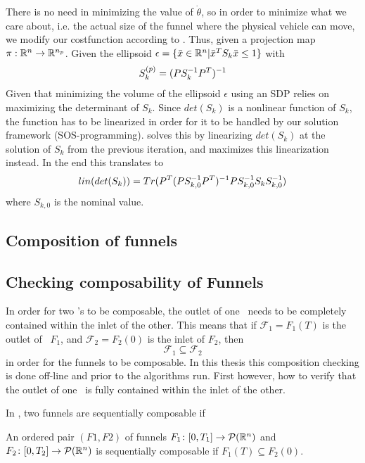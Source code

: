 There is no need in minimizing the value of \(\dot{\theta}\), so in order to
minimize what we care about, i.e. the actual size of the funnel where the
physical vehicle can move, we modify our costfunction according to
\cite{majumdarFunnelLibrariesRealtime2017}. Thus, given a projection map \(\pi :
\mathbb{R}^n \rightarrow \mathbb{R}^{n_p}\). Given the ellipsoid \(\epsilon = \lbrace\bar{x} \in
  \mathbb{R}^n | \bar{x}^TS_{k}\bar{x} \leq 1\rbrace\) with
\[
  S_k^{(p)} = \lparen PS_k^{-1}P^T\rparen^{-1}
\]
Given that minimizing the volume of the ellipsoid \(\epsilon\) using an SDP
relies on maximizing the determinant of \(S_k\). Since \(det(S_k)\) is a
nonlinear function of \(S_k\), the function has to be linearized in order for it
to be handled by our solution framework (SOS-programming).
\cite{majumdarFunnelLibrariesRealtime2017} solves this by linearizing
\(det(S_k)\) at the solution of \(S_k\) from the previous iteration, and
maximizes this linearization instead. In the end this translates to
\[
  lin\lparen det\lparen S_k\rparen\rparen =
  Tr\lparen P^T\lparen PS_{k,0}^{-1}P^T\rparen^{-1}PS_{k,0}^{-1}S_kS_{k,0}^{-1}\rparen
\]
where \(S_{k,0}\) is the nominal value.

\subsection{Composition of funnels}

\subsection{Checking composability of Funnels}

In order for two \funnel's to be composable, the outlet of one \funnel\ needs to
be completely contained within the inlet of the other. This means that if
\(\mathcal{F}_1 = F_1(T)\) is the outlet of \funnel\ \(F_1\), and
\(\mathcal{F}_2 = F_2(0)\) is the inlet of \(F_2\), then
\[
  \mathcal{F}_1 \subseteq \mathcal{F}_2
\]
\label{composability}
in order for the funnels to be composable. In this thesis this composition
checking is done off-line and prior to the algorithms run. First however, how to
verify that the outlet of one \funnel\ is fully contained within the inlet of
the other.

In \cite[Majumdar and Tedrake, p.~47]{majumdarFunnelLibrariesRealtime2017}, two
funnels are sequentially composable if
\begin{definition}
  \label{def:funnel-composition}
  An ordered pair \((F1, F2)\) of funnels \(F_1 \colon [0,T_1] \rightarrow
  \mathcal{P}(\mathbb{R}^n)\) and \(F_2 \colon [0,T_2] \rightarrow \mathcal{P}(\mathbb{R}^n)\)
  is sequentially composable if \(F_1(T) \subseteq F_2(0)\).
\end{definition}

